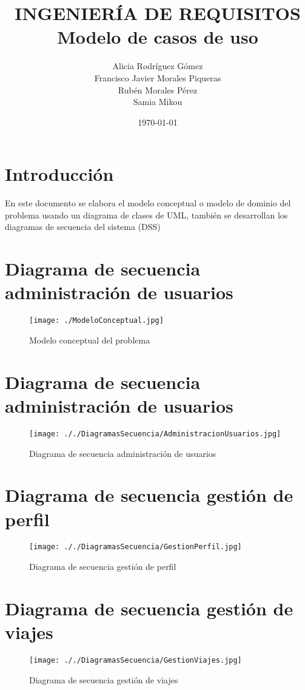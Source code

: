 \documentclass[11pt,spanish]{article} %
\title{INGENIERÍA DE REQUISITOS \\
	Modelo de casos de uso}
\author{Alicia Rodríguez Gómez \\
	Francisco Javier Morales Piqueras \\
	Rubén Morales Pérez \\
	Samia Mikou}
\date{\today}
\begin{document}
\maketitle
\tableofcontents %
\setlength\parindent{0pt} %
\newpage 

\vspace{5cm}
\section{Introducción}
En este documento se elabora el modelo conceptual o modelo de dominio del problema usando un diagrama de clases de UML, también se desarrollan los diagramas de secuencia del sistema (DSS)



\section{Diagrama de secuencia administración de usuarios}
\begin{figure}[H]
	\centering
	\label{ModeloConceptual}
	\texttt{[image: ./ModeloConceptual.jpg]}
	\caption{Modelo conceptual del problema}
\end{figure}

\section{Diagrama de secuencia administración de usuarios}
\begin{figure}[H]
	\centering
	\label{AdministracionUsuarios}
	\texttt{[image: ././DiagramasSecuencia/AdministracionUsuarios.jpg]}
	\caption{Diagrama de secuencia administración de usuarios}
\end{figure}

\section{Diagrama de secuencia gestión de perfil}
\begin{figure}[H]
	\centering
	\label{GestionPerfil}
	\texttt{[image: ././DiagramasSecuencia/GestionPerfil.jpg]}
	\caption{Diagrama de secuencia gestión de perfil}
\end{figure}

\section{Diagrama de secuencia gestión de viajes}
\begin{figure}[H]
	\centering
	\label{GestionViaje}
	\texttt{[image: ././DiagramasSecuencia/GestionViajes.jpg]}
	\caption{Diagrama de secuencia gestión de viajes}
\end{figure}
\end{document}
